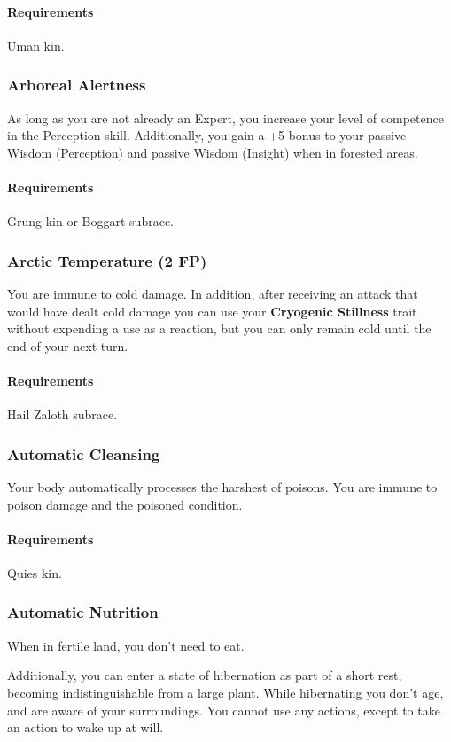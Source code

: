     \paragraph{Requirements} Uman kin.
\subsubsection{Arboreal Alertness} \label{feat::arborealalertness}
    As long as you are not already an Expert, you increase your level of competence in the Perception skill.
    Additionally, you gain a +5 bonus to your passive Wisdom (Perception) and passive Wisdom (Insight) when in forested areas.
    \paragraph{Requirements} Grung kin or Boggart subrace.
\subsubsection{Arctic Temperature (2 FP)} \label{feat::arctictemperature}
    You are immune to cold damage.
    In addition, after receiving an attack that would have dealt cold damage you can use your \textbf{Cryogenic Stillness} trait without expending a use as a reaction, but you can only remain cold until the end of your next turn.
    \paragraph{Requirements} Hail Zaloth subrace.
\subsubsection{Automatic Cleansing} \label{feat::automaticcleansing}
    Your body automatically processes the harshest of poisons.
    You are immune to poison damage and the poisoned condition.
    \paragraph{Requirements} Quies kin.
\subsubsection{Automatic Nutrition} \label{feat::automaticnutrition}
    When in fertile land, you don't need to eat.

    Additionally, you can enter a state of hibernation as part of a short rest, becoming indistinguishable from a large plant.
    While hibernating you don't age, and are aware of your surroundings.
    You cannot use any actions, except to take an action to wake up at will.
